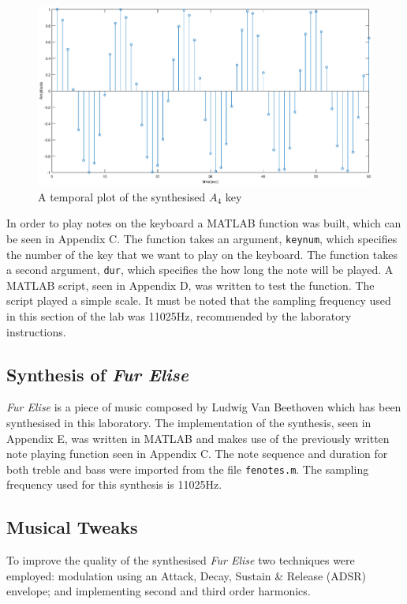 \documentclass{article}
\begin{document}
\begin{figure}[H]
	\centering
	\includegraphics[scale=0.25]{fig2.eps}
	\caption{A temporal plot of the synthesised $A_4$ key}
\end{figure}

In order to play notes on the keyboard a MATLAB function was built, which can be seen in Appendix C. The function takes an argument, \verb|keynum|, which specifies the number of the key that we want to play on the keyboard. The function takes a second argument, \verb|dur|, which specifies the how long the note will be played. A MATLAB script, seen in Appendix D, was written to test the function. The script played a simple scale. It must be noted that the sampling frequency used in this section of the lab was 11025$\si{\hertz}$, recommended by the laboratory instructions.

\newpage

\subsection{Synthesis of \textit{Fur Elise}}
\textit{Fur Elise} is a piece of music composed by Ludwig Van Beethoven which has been synthesised in this laboratory. The implementation of the synthesis, seen in Appendix E, was written in MATLAB and makes use of the previously written note playing function seen in Appendix C. The note sequence and duration for both treble and bass were imported from the file \verb|fenotes.m|. The sampling frequency used for this synthesis is 11025$\si{\hertz}$.


\subsection{Musical Tweaks}
To improve the quality of the synthesised \textit{Fur Elise} two techniques were employed: modulation using an Attack, Decay, Sustain \& Release (ADSR) envelope; and implementing second and third order harmonics.
\end{document}
